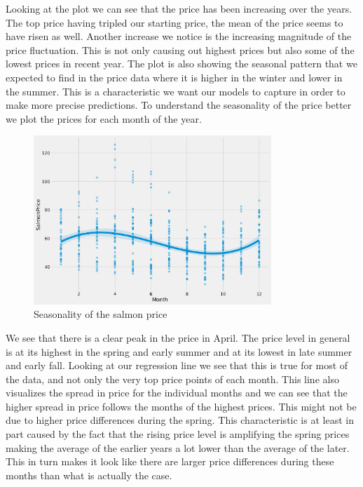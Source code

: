 Looking at the plot we can see that the price has been increasing over the years. The top price having tripled our starting price, the mean of the price seems to have risen as well. Another increase we notice is the increasing magnitude of the price fluctuation. This is not only causing out highest prices but also some of the lowest prices in recent year. The plot is also showing the seasonal pattern that we expected to find in the price data where it is higher in the winter and lower in the summer. This is a characteristic we want our models to capture in order to make more precise predictions. To understand the seasonality of the price better we plot the prices for each month of the year.

\begin{figure}[H]
    \centering
    \includegraphics[width=0.8\textwidth]{data/Figures/Descriptive/seasonality.png}
    \caption[Seasonality of the salmon price]{Seasonality of the salmon price}\label{fig:Seasonality of the salmon price}
\end{figure}

We see that there is a clear peak in the price in April. The price level in general is at its highest in the spring and early summer and at its lowest in late summer and early fall. Looking at our regression line we see that this is true for most of the data, and not only the very top price points of each month. This line also visualizes the spread in price for the individual months and we can see that the higher spread in price follows the months of the highest prices. This might not be due to higher price differences during the spring. This characteristic is at least in part caused by the fact that the rising price level is amplifying the spring prices making the average of the earlier years a lot lower than the average of the later. This in turn makes it look like there are larger price differences during these months than what is actually the case.

